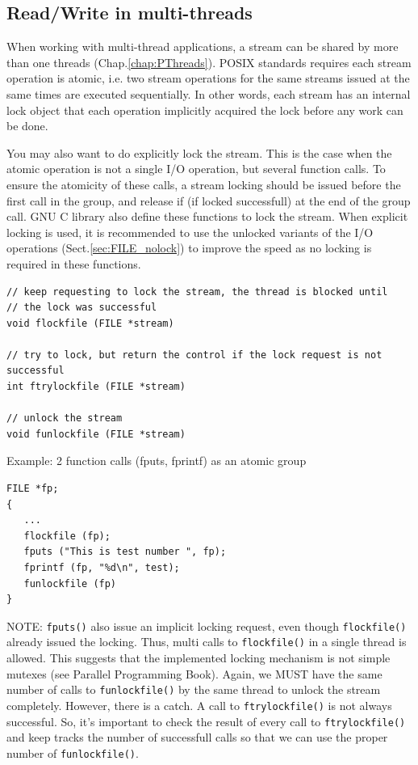 \subsection{Read/Write in multi-threads}
\label{sec:FILE_multi-threads}

When working with multi-thread applications, a stream can be shared by more than
one threads (Chap.\ref{chap:PThreads}). POSIX standards requires each stream
operation is atomic, i.e. two stream operations for the same streams issued at
the same times are executed sequentially. In other words, each stream has an
internal lock object that each operation implicitly acquired the lock before any
work can be done.

You may also want to do explicitly lock the stream. This is the case when the
atomic operation is not a single I/O operation, but several function calls. To
ensure the atomicity of these calls, a stream locking should be issued before
the first call in the group, and release if (if locked successfull) at the end
of the group call. GNU C library also define these functions to lock the stream.
When explicit locking is used, it is recommended to use the unlocked variants of
the I/O operations (Sect.\ref{sec:FILE_nolock}) to improve the speed as no
locking is required in these functions.

\begin{Verbatim}
// keep requesting to lock the stream, the thread is blocked until 
// the lock was successful 
void flockfile (FILE *stream)

// try to lock, but return the control if the lock request is not successful
int ftrylockfile (FILE *stream)

// unlock the stream
void funlockfile (FILE *stream)
\end{Verbatim}


Example: 2 function calls (fputs, fprintf) as an atomic group
\begin{Verbatim}
FILE *fp;
{
   ...
   flockfile (fp);
   fputs ("This is test number ", fp);
   fprintf (fp, "%d\n", test);
   funlockfile (fp)
}
\end{Verbatim}

NOTE: \verb!fputs()! also issue an implicit locking request, even though
\verb!flockfile()! already issued the locking. Thus, multi calls to
\verb!flockfile()! in a single thread is allowed. This suggests that the
implemented locking mechanism is not simple mutexes (see Parallel Programming
Book). Again, we MUST have the same number of calls to \verb!funlockfile()! by
the same thread to unlock the stream completely. However, there is a catch. A call to
\verb!ftrylockfile()! is not always successful. So, it's important to check the
result of every call to \verb!ftrylockfile()! and keep tracks the number of
successfull calls so that we can use the proper number of \verb!funlockfile()!.

